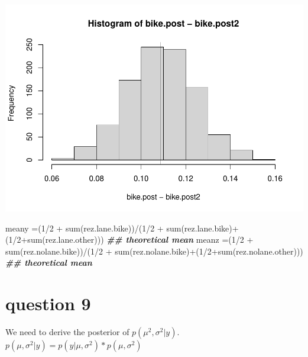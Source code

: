 \documentclass[
]{book}
\newenvironment{Shaded}{\begin{snugshade}}{\end{snugshade}}
\newcommand{\DecValTok}[1]{\textcolor[rgb]{0.00,0.00,0.81}{#1}}
\newcommand{\DocumentationTok}[1]{\textcolor[rgb]{0.56,0.35,0.01}{\textbf{\textit{#1}}}}
\newcommand{\FunctionTok}[1]{\textcolor[rgb]{0.00,0.00,0.00}{#1}}
\newcommand{\NormalTok}[1]{#1}
\newcommand{\OtherTok}[1]{\textcolor[rgb]{0.56,0.35,0.01}{#1}}
\newcommand{\SpecialCharTok}[1]{\textcolor[rgb]{0.00,0.00,0.00}{#1}}
\theoremstyle{definition}
\theoremstyle{definition}
\theoremstyle{definition}
\theoremstyle{definition}
\theoremstyle{remark}
\begin{document}
\includegraphics{_main_files/figure-latex/unnamed-chunk-48-1.pdf}

\begin{Shaded}
\begin{Highlighting}[]
\NormalTok{ meany }\OtherTok{=}\NormalTok{(}\DecValTok{1}\SpecialCharTok{/}\DecValTok{2} \SpecialCharTok{+} \FunctionTok{sum}\NormalTok{(rez.lane.bike))}\SpecialCharTok{/}\NormalTok{(}\DecValTok{1}\SpecialCharTok{/}\DecValTok{2} \SpecialCharTok{+} \FunctionTok{sum}\NormalTok{(rez.lane.bike)}\SpecialCharTok{+}\NormalTok{(}\DecValTok{1}\SpecialCharTok{/}\DecValTok{2}\SpecialCharTok{+}\FunctionTok{sum}\NormalTok{(rez.lane.other))) }\DocumentationTok{\#\# theoretical mean}
\NormalTok{  meanz }\OtherTok{=}\NormalTok{(}\DecValTok{1}\SpecialCharTok{/}\DecValTok{2} \SpecialCharTok{+} \FunctionTok{sum}\NormalTok{(rez.nolane.bike))}\SpecialCharTok{/}\NormalTok{(}\DecValTok{1}\SpecialCharTok{/}\DecValTok{2} \SpecialCharTok{+} \FunctionTok{sum}\NormalTok{(rez.nolane.bike)}\SpecialCharTok{+}\NormalTok{(}\DecValTok{1}\SpecialCharTok{/}\DecValTok{2}\SpecialCharTok{+}\FunctionTok{sum}\NormalTok{(rez.nolane.other))) }\DocumentationTok{\#\# theoretical mean}
\end{Highlighting}
\end{Shaded}

\hypertarget{question-9}{%
\section*{question 9}\label{question-9}}

We need to derive the posterior of \(p(\mu^2, \sigma^2 | y)\). \(p(\mu,\sigma^2 | y) = p(y|\mu,\sigma^2)*p(\mu , \sigma^2)\)
\end{document}
